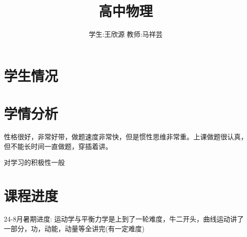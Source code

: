 \documentclass{article}
\title{高中物理}
\author{学生:\quad 王欣源 \quad 教师:\quad 马祥芸}
\begin{document}
\maketitle
\tableofcontents
\newpage
{}

\section{学生情况}
\begin{center}
\end{center}

\section{学情分析}
性格很好，非常好带，做题速度非常快，但是惯性思维非常重。上课做题很认真，但不能长时间一直做题，穿插着讲。

对学习的积极性一般

\vspace{2em}

\section{课程进度}
24-8月暑期进度: 运动学与平衡力学是上到了一轮难度，牛二开头，曲线运动讲了一部分，功，动能，动量等全讲完(有一定难度)
\end{document}
